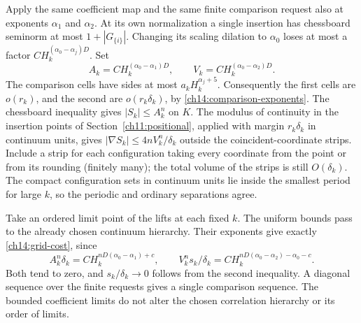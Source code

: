 Apply the same coefficient map and the same finite comparison request
also at exponents $\alpha_1$ and $\alpha_2$. At its own normalization
a single insertion has chessboard seminorm at most $1+|G_{\{i\}}|$. Changing its
scaling dilation to $\alpha_0$ loses at most a factor
$CH_k^{(\alpha_0-\alpha_j)D}$. Set
\[
 A_k=CH_k^{(\alpha_0-\alpha_1)D},\qquad
 V_k=CH_k^{(\alpha_0-\alpha_2)D}.
\]
The comparison cells have sides at most $a_kH_k^{\alpha_j+5}$.
Consequently the first cells are $o(r_k)$, and the second are
$o(r_k\delta_k)$, by \eqref{ch14:comparison-exponents}.
The chessboard inequality gives $|S_k|\le A_k^n$ on $K$.
The modulus of continuity in the insertion points of Section~\ref{ch11:positional}, applied
with margin $r_k\delta_k$ in continuum units, gives
$|\nabla S_k|\le4nV_k^n/\delta_k$ outside the coincident-coordinate strips.
Include a strip for each configuration taking every coordinate from the point or
from its rounding (finitely many); the total volume of the strips is still $O(\delta_k)$.
The compact configuration sets in continuum units lie inside the smallest period for large $k$,
so the periodic and ordinary separations agree.

Take an ordered limit point of the lifts at each fixed $k$. The
uniform bounds pass to the already chosen continuum hierarchy.
Their exponents give exactly \eqref{ch14:grid-cost}, since
\[
 A_k^n\delta_k=CH_k^{nD(\alpha_0-\alpha_1)+c},\qquad
 V_k^ns_k/\delta_k=CH_k^{nD(\alpha_0-\alpha_2)-\alpha_0-c}.
\]
Both tend to zero, and $s_k/\delta_k\to0$ follows from the second
inequality. A diagonal sequence over the finite requests gives a
single comparison sequence. The bounded coefficient limits do not
alter the chosen correlation hierarchy or its order of limits.
